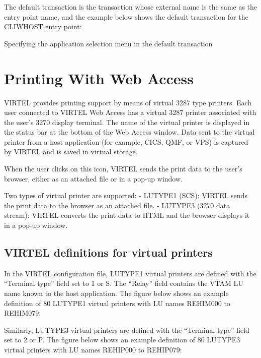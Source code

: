\documentclass[letterpaper,10pt,english]{sphinxmanual}
\begin{document}
The default transaction is the transaction whose external name is the same as the entry point name, and the example
below shows the default transaction for the CLIWHOST entry point:

Specifying the application selection menu in the default transaction


\section{Printing With Web Access}
\label{\detokenize{User_Guide:printing-with-web-access}}
VIRTEL provides printing support by means of virtual 3287 type printers. Each user connected to VIRTEL Web Access
has a virtual 3287 printer associated with the user’s 3270 display terminal. The name of the virtual printer is displayed
in the status bar at the bottom of the Web Access window. Data sent to the virtual printer from a host application (for
example, CICS, QMF, or VPS) is captured by VIRTEL and is saved in virtual storage.

 

When the user clicks on this icon, VIRTEL sends the print data to the user’s browser, either as an attached file or in a
pop-up window.

Two types of virtual printer are supported:
- LUTYPE1 (SCS): VIRTEL sends the print data to the browser as an attached file.
- LUTYPE3 (3270 data stream): VIRTEL converts the print data to HTML and the browser displays it in a pop-up window.


\subsection{VIRTEL definitions for virtual printers}
\label{\detokenize{User_Guide:virtel-definitions-for-virtual-printers}}
In the VIRTEL configuration file, LUTYPE1 virtual printers are defined with the “Terminal type” field set to 1 or S. The
“Relay” field contains the VTAM LU name known to the host application. The figure below shows an example definition
of 80 LUTYPE1 virtual printers with LU names REHIM000 to REHIM079:

 

Similarly, LUTYPE3 virtual printers are defined with the “Terminal type” field set to 2 or P. The figure below shows an
example definition of 80 LUTYPE3 virtual printers with LU names REHIP000 to REHIP079:
\end{document}
